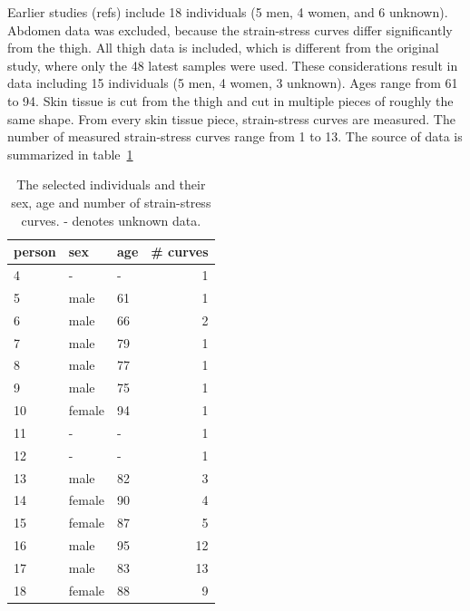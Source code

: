 Earlier studies (refs) include 18 individuals (5 men, 4 women, and 6 unknown).
Abdomen data was excluded, because the strain-stress curves differ significantly from the thigh.
All thigh data is included, which is different from the original study, where only the 48 latest samples were used.
These considerations result in data including 15 individuals (5 men, 4 women, 3 unknown).
Ages range from 61 to 94.
Skin tissue is cut from the thigh and cut in multiple pieces of roughly the same shape.
From every skin tissue piece, strain-stress curves are measured.
The number of measured strain-stress curves range from 1 to 13.
The source of data is summarized in table~\ref{tab:source_of_data}
\begin{table}
    \centering
    \caption[Source of data]{
        The selected individuals and their sex, age and number of strain-stress curves.
        - denotes unknown data.
    }
    \label{tab:source_of_data}
    \begin{tabular}{lllr}
        \toprule
        person & sex    & age & \# curves \\
        \midrule
        4      & -      & -   & 1         \\
        5      & male   & 61  & 1         \\
        6      & male   & 66  & 2         \\
        7      & male   & 79  & 1         \\
        8      & male   & 77  & 1         \\
        9      & male   & 75  & 1         \\
        10     & female & 94  & 1         \\
        11     & -      & -   & 1         \\
        12     & -      & -   & 1         \\
        13     & male   & 82  & 3         \\
        14     & female & 90  & 4         \\
        15     & female & 87  & 5         \\
        16     & male   & 95  & 12        \\
        17     & male   & 83  & 13        \\
        18     & female & 88  & 9         \\
        \bottomrule
    \end{tabular}
\end{table}